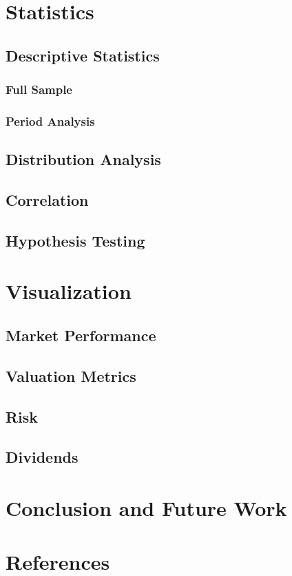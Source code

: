 \documentclass[a4paper,12pt]{report}
\begin{document}
\chapter{Statistics}
\section{Descriptive Statistics}
\subsection{Full Sample}
\subsection{Period Analysis}
\section{Distribution Analysis}
\section{Correlation}
\section{Hypothesis Testing}
\chapter{Visualization}
\section{Market Performance}
\section{Valuation Metrics}
\section{Risk}
\section{Dividends}
\chapter*{Conclusion and Future Work}
\chapter{References}
\end{document}
